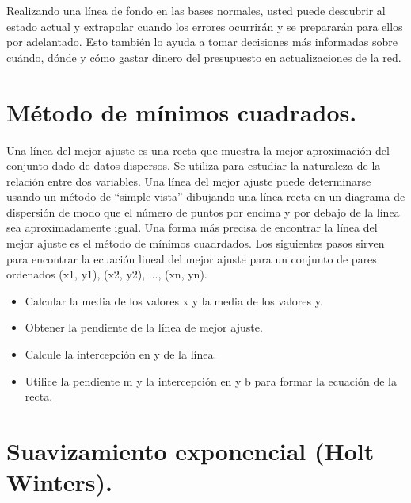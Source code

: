 \noindent
Realizando una línea de fondo en las bases normales, usted puede descubrir al estado actual y extrapolar cuando los errores ocurrirán y se
prepararán para ellos por adelantado. Esto también lo ayuda a tomar decisiones más informadas sobre cuándo, dónde y cómo gastar dinero del
presupuesto en actualizaciones de la red. \cite{lineaBase}

\section{Método de mínimos cuadrados.}

\noindent
Una línea del mejor ajuste es una recta que muestra la mejor aproximación del conjunto dado de datos dispersos. Se utiliza para estudiar la naturaleza de la relación entre dos variables.
\newline
Una línea del mejor ajuste puede determinarse usando un método de “simple vista” dibujando una línea recta en un diagrama de dispersión de modo que el número de puntos por encima y por debajo de la línea sea aproximadamente igual.
\newline
Una forma más precisa de encontrar la línea del mejor ajuste es el método de mínimos cuadrdados.
\newline
\newline
Los siguientes pasos sirven para encontrar la ecuación lineal del mejor ajuste para un conjunto de pares ordenados (x1, y1), (x2, y2), ..., (xn, yn).
\begin{itemize}
	\item Calcular la media de los valores x y la media de los valores y.
	\item Obtener la pendiente de la línea de mejor ajuste.
	\item Calcule la intercepción en y de la línea.
	\item Utilice la pendiente m y la intercepción en y b para formar la ecuación de la recta.
\end{itemize}

\section{Suavizamiento exponencial (Holt Winters).}

